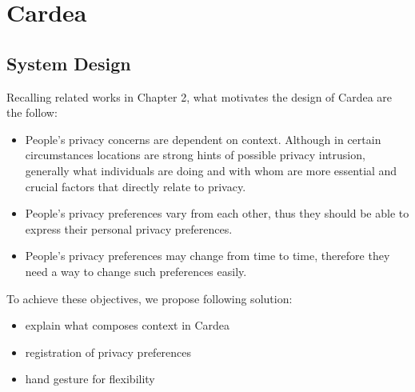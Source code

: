 \chapter{Cardea}\label{sec-cardea}

\section{System Design}
Recalling related works in Chapter 2, what motivates the design of Cardea are the follow:

\begin{itemize}
\item People's privacy concerns are dependent on context. Although in certain circumstances locations are strong hints of possible privacy intrusion, generally what individuals are doing and with whom are more essential and crucial factors that directly relate to privacy.
\item People's privacy preferences vary from each other, thus they should be able to express their personal privacy preferences.
\item People's privacy preferences may change from time to time, therefore they need a way to change such preferences easily.
\end{itemize}

To achieve these objectives, we propose following solution:
\begin{itemize}
\item explain what composes context in Cardea
\item registration of privacy preferences
\item hand gesture for flexibility
\end{itemize}

